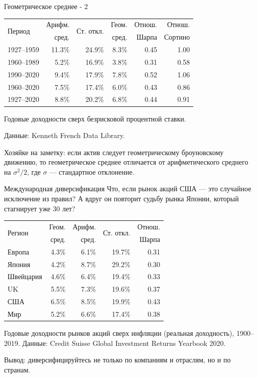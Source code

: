 \documentclass{beamer}
\begin{document}
\begin{frame}{Геометрическое среднее - 2}
\centering
\begin{tabular}{l|r|r|r|r|r}
\multirow{2}{*}{Период} &
Арифм. & 
\multirow{2}{*}{Ст. откл.} &
Геом. &
Отнош. &
Отнош. \\
& сред. & & сред. & Шарпа & Сортино \\ 
\hline
1927--1959 & 11.3\% & 24.9\% & 8.3\% & 0.45 & 1.00 \\
1960--1989 &  5.2\% & 16.9\% & 3.8\% & 0.31 & 0.58 \\
1990--2020 &  9.4\% & 17.9\% & 7.8\% & 0.52 & 1.06 \\
1960--2020 &  7.5\% & 17.4\% & 6.0\% & 0.43 & 0.86 \\ \hline
1927--2020 &  8.8\% & 20.2\% & 6.8\% & 0.44 & 0.91
\end{tabular}

{\scriptsize Годовые доходности сверх безрисковой процентной ставки.

Данные: Kenneth French Data Library. \par }

\justify
Хозяйке на заметку: если актив следует геометрическому броуновскому движению,
то геометрическое среднее отличается от арифметического среднего на $
\sigma^2/2$, где $\sigma$ --- стандартное отклонение.
\end{frame}


\begin{frame}{Международная диверсификация}
\justify
Что, если рынок акций США --- это случайное исключение из правил? А вдруг он 
повторит судьбу рынка Японии, который стагнирует уже 30 лет?

\centering
\begin{tabular}{l|r|r|r|r}
\multirow{2}{*}{Регион} &
Геом. & 
Арифм. &
\multirow{2}{*}{Ст. откл.} &
Отнош. \\
& сред. & сред. & & Шарпа \\ \hline
Европа    & 4.3\% & 6.1\% & 19.7\% & 0.31 \\
Япония    & 4.2\% & 8.7\% & 29.2\% & 0.30 \\
Швейцария & 4.6\% & 6.4\% & 19.4\% & 0.33 \\
UK        & 5.5\% & 7.3\% & 19.6\% & 0.37 \\
США       & 6.5\% & 8.5\% & 19.9\% & 0.43 \\ \hline
Мир       & 5.2\% & 6.6\% & 17.4\% & 0.38
\end{tabular}

\centering
{\scriptsize Годовые доходности рынков акций сверх инфляции (реальная доходность),
1900--2019. Данные: Credit Suisse Global Investment Returns Yearbook 2020.}

\justify
Вывод: диверсифицируйтесь не только по компаниям и отраслям, но и по странам.
\end{frame}
\end{document}

